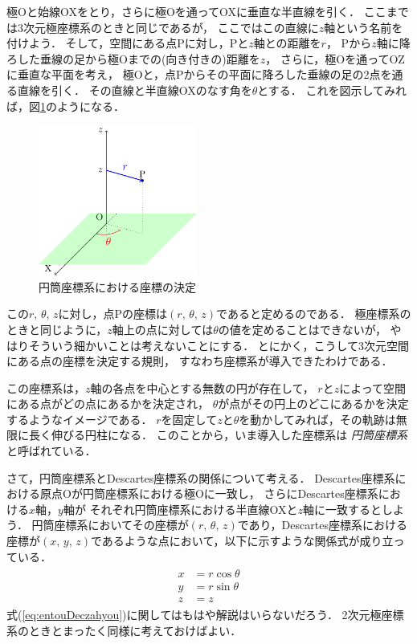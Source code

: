 極Oと始線OXをとり，さらに極Oを通ってOXに垂直な半直線を引く．
ここまでは3次元極座標系のときと同じであるが，
ここではこの直線に$z$軸という名前を付けよう．
そして，空間にある点Pに対し，Pと$z$軸との距離を$r$，
Pから$z$軸に降ろした垂線の足から極Oまでの(向き付きの)距離を$z$，
さらに，極Oを通ってOZに垂直な平面を考え，
極Oと，点Pからその平面に降ろした垂線の足の2点を通る直線を引く．
その直線と半直線OXのなす角を$\theta$とする．
これを図示してみれば，図\ref{fig:entou}のようになる．
\begin{figure}[h]
 \begin{center}
 \includegraphics[width=5.2cm]{picture/vecter29.pdf}
 \caption{円筒座標系における座標の決定}
\label{fig:entou}
 \end{center}
\end{figure}


この$r, \, \theta, \, z$に対し，点Pの座標は$(r, \, \theta, \, z)$であると定めるのである．
極座標系のときと同じように，$z$軸上の点に対しては$\theta$の値を定めることはできないが，
やはりそういう細かいことは考えないことにする．
とにかく，こうして3次元空間にある点の座標を決定する規則，
すなわち座標系が導入できたわけである．

この座標系は，$z$軸の各点を中心とする無数の円が存在して，
$r$と$z$によって空間にある点がどの点にあるかを決定され，
$\theta$が点がその円上のどこにあるかを決定するようなイメージである．
$r$を固定して$z$と$\theta$を動かしてみれば，その軌跡は無限に長く伸びる円柱になる．
このことから，いま導入した座標系は
\emph{円筒座標系}と呼ばれている．

さて，円筒座標系とDescartes座標系の関係について考える．
Descartes座標系における原点Oが円筒座標系における極Oに一致し，
さらにDescartes座標系における$x$軸，$y$軸が
それぞれ円筒座標系における半直線OXと$z$軸に一致するとしよう．
円筒座標系においてその座標が$(r, \, \theta, \, z)$であり，Descartes座標系における
座標が$(x, \, y, \, z)$であるような点において，以下に示すような関係式が成り立っている．
\begin{align}
\begin{aligned}
x & = r \cos \theta \\
y & = r \sin \theta \\
z & = z
\label{eq:entouDeczahyou}
\end{aligned}
\end{align}
式(\ref{eq:entouDeczahyou})に関してはもはや解説はいらないだろう．
2次元極座標系のときとまったく同様に考えておけばよい．

